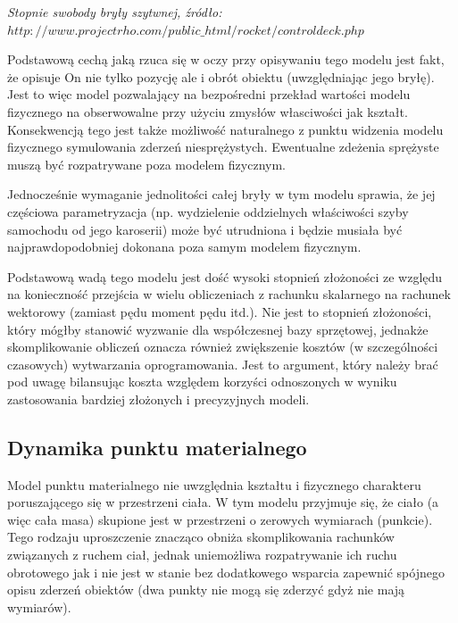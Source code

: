 \par{
\begin{center}
\textit{Stopnie swobody bryły szytwnej, źródło: $http://www.projectrho.com/public\_html/rocket/controldeck.php$}
\end{center}
}
\par{
Podstawową cechą jaką rzuca się w oczy przy opisywaniu tego modelu jest fakt, że opisuje On nie tylko pozycję ale i obrót obiektu (uwzględniając jego bryłę). Jest to więc model pozwalający na bezpośredni przekład wartości modelu fizycznego na obserwowalne przy użyciu zmysłów własciwości jak kształt. Konsekwencją tego jest także możliwość naturalnego z punktu widzenia modelu fizycznego symulowania zderzeń niesprężystych. Ewentualne zdeżenia sprężyste muszą być rozpatrywane poza  modelem fizycznym.
}
\par{
Jednocześnie wymaganie jednolitości całej bryły w tym modelu sprawia, że jej częściowa parametryzacja (np. wydzielenie oddzielnych właściwości szyby samochodu od jego karoserii) może być utrudniona i będzie musiała być najprawdopodobniej dokonana poza samym modelem fizycznym.
}
\par{
Podstawową wadą tego modelu jest dość wysoki stopnień złożoności ze względu na konieczność przejścia w wielu obliczeniach z rachunku skalarnego na rachunek wektorowy (zamiast pędu moment pędu itd.). Nie jest to stopnień złożoności, który mógłby stanowić wyzwanie dla współczesnej bazy sprzętowej, jednakże skomplikowanie obliczeń oznacza również zwiększenie kosztów (w szczególności czasowych) wytwarzania oprogramowania. Jest to argument, który należy brać pod uwagę bilansując koszta względem korzyści odnoszonych w wyniku zastosowania bardziej złożonych i precyzyjnych modeli.
}

\subsection{Dynamika punktu materialnego}
\par{
Model punktu materialnego nie uwzględnia kształtu i fizycznego charakteru poruszającego się w przestrzeni ciała. W tym modelu przyjmuje się, że ciało (a więc cała masa) skupione jest w przestrzeni o zerowych wymiarach (punkcie). Tego rodzaju uproszczenie znacząco obniża skomplikowania rachunków związanych z ruchem ciał, jednak uniemożliwa rozpatrywanie ich ruchu obrotowego jak i nie jest w stanie bez dodatkowego wsparcia zapewnić spójnego opisu zderzeń obiektów (dwa punkty nie mogą się zderzyć gdyż nie mają wymiarów).
}

